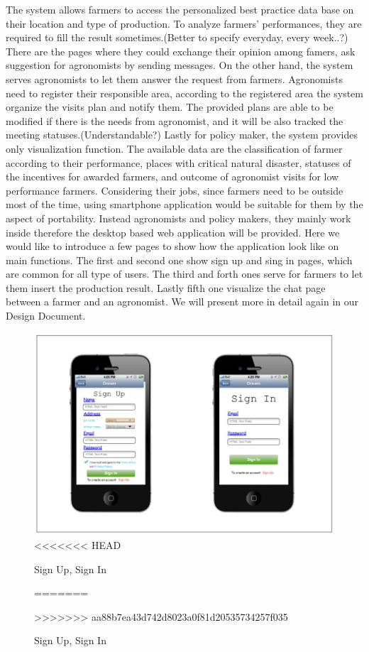 The system allows farmers to access the personalized best practice data base on their location and type of production. To analyze farmers' performances, they are required to fill the result sometimes.(Better to specify everyday, every week..?) There are the pages where they could exchange their opinion among famers, ask suggestion for agronomists by sending messages. 
\newline
On the other hand, the system serves agronomists to let them answer the request from farmers. 
Agronomists need to register their responsible area, according to the registered area the system organize the visits plan and notify them. The provided plans are able to be modified if there is the needs from agronomist, and it will be also tracked the meeting statuses.(Understandable?)
\newline
Lastly for policy maker, the system provides only visualization function. The available data are the
classification of farmer according to their performance, places with critical natural disaster, statuses of the incentives for awarded farmers, and outcome of agronomist visits for low performance farmers. Considering their jobs, since farmers need to be outside most of the time, using smartphone application would be suitable for them by the aspect of portability. Instead agronomists and policy makers, they mainly work inside therefore the desktop based web application will be provided. 
\newline
\newline
Here we would like to introduce a few pages to show how the application look like on main functions. The first and second one show sign up and sing in pages, which are common for all type of users. The third and forth ones serve for farmers to let them insert the production result. Lastly fifth one visualize the chat page between a farmer and an agronomist. We will present more in detail again in our Design Document. 

\begin{figure}[H]
	\centering
    \includegraphics[page=1, width=\textwidth]{Images/sign_up_in.JPG}
<<<<<<< HEAD
	\caption{\label{fig:FE_image1}Sign Up, Sign In}
=======
	\caption{\label{fig:FE_image}Sign Up, Sign In}
>>>>>>> aa88b7ea43d742d8023a0f81d20535734257f035
\end{figure}

